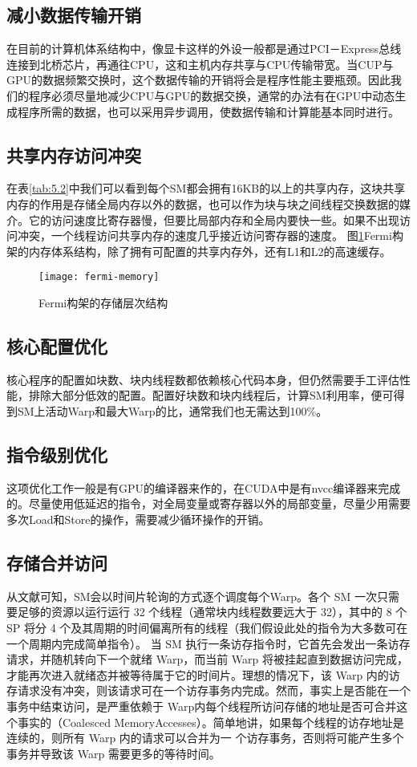 \subsection{减小数据传输开销}
在目前的计算机体系结构中，像显卡这样的外设一般都是通过PCI－Express总线连接到北桥芯片，再通往CPU，这和主机内存共享与CPU传输带宽。当CUP与GPU的数据频繁交换时，这个数据传输的开销将会是程序性能主要瓶颈。因此我们的程序必须尽量地减少CPU与GPU的数据交换，通常的办法有在GPU中动态生成程序所需的数据，也可以采用异步调用，使数据传输和计算能基本同时进行。
\subsection{共享内存访问冲突}
在表\ref{tab:5.2}中我们可以看到每个SM都会拥有16KB的以上的共享内存，这块共享内存的作用是存储全局内存以外的数据，也可以作为块与块之间线程交换数据的媒介。它的访问速度比寄存器慢，但要比局部内存和全局内要快一些。如果不出现访问冲突，一个线程访问共享内存的速度几乎接近访问寄存器的速度。
图\ref{fig:5.11}Fermi构架的内存体系结构，除了拥有可配置的共享内存外，还有L1和L2的高速缓存。
\begin{figure}[!ht]
\centering
\texttt{[image: fermi-memory]}
\caption{Fermi构架的存储层次结构}
\label{fig:5.11}
\end{figure}
\subsection{核心配置优化}
核心程序的配置如块数、块内线程数都依赖核心代码本身，但仍然需要手工评估性能，排除大部分低效的配置。配置好块数和块内线程后，计算SM利用率，便可得到SM上活动Warp和最大Warp的比，通常我们也无需达到100\%。
\subsection{指令级别优化}
这项优化工作一般是有GPU的编译器来作的，在CUDA中是有nvcc编译器来完成的。尽量使用低延迟的指令，对全局变量或寄存器以外的局部变量，尽量少用需要多次Load和Store的操作，需要减少循环操作的开销。
\subsection{存储合并访问}
从文献\cite{cuda05}可知，SM会以时间片轮询的方式逐个调度每个Warp。各个 SM 一次只需要足够的资源以运行运行 32 个线程（通常块内线程数要远大于 32），其中的 8 个 SP 将分 4 个及其周期的时间偏离所有的线程（我们假设此处的指令为大多数可在一个周期内完成简单指令）。
当 SM 执行一条访存指令时，它首先会发出一条访存请求，并随机转向下一个就绪 Warp，而当前 Warp 将被挂起直到数据访问完成，才能再次进入就绪态并被等待属于它的时间片。理想的情况下，该 Warp 内的访存请求没有冲突，则该请求可在一个访存事务内完成。然而，事实上是否能在一个事务中结束访问，是严重依赖于 Warp内每个线程所访问存储的地址是否可合并这个事实的（Coalesced MemoryAccesses）。简单地讲，如果每个线程的访存地址是连续的，则所有 Warp 内的请求可以合并为一
个访存事务，否则将可能产生多个事务并导致该 Warp 需要更多的等待时间\cite{cuda02}。
